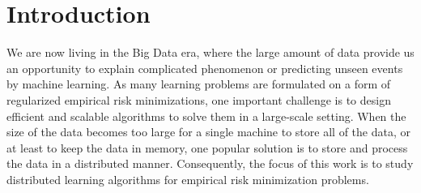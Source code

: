 \documentclass{article}
\newcommand{\1}[0]{\ensuremath{\boldsymbol{1}}\xspace}
\begin{document}

\begin{abstract} 

\end{abstract} 

\section{Introduction}

We are now living in the Big Data era, where the large amount of data provide us an opportunity to explain complicated phenomenon or predicting unseen events by machine learning. As many learning problems are formulated on a form of regularized empirical risk minimizations, one important challenge is to design efficient and scalable algorithms to solve them in a large-scale setting. When the size of the data becomes too large for a single machine to store all of the data, or at least to keep the data in memory, one popular solution is to store and process the data in a distributed manner. Consequently, the focus of this work is to study distributed learning algorithms \cite{Bertsekas1989} for empirical risk minimization problems.
\end{document}
